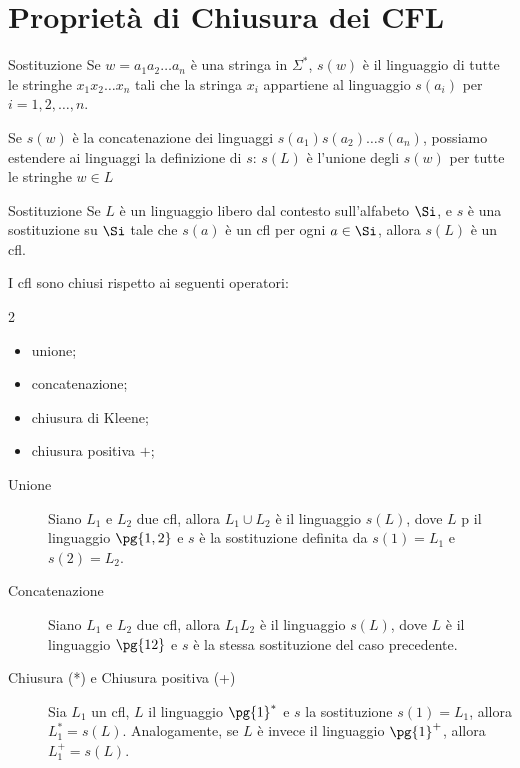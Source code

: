 \section{Proprietà di Chiusura dei CFL}\label{sec:ll_propriet_di_chiusura_dei_cfl} %
\begin{definition}{Sostituzione}{}
    Se $w = a_1a_2\dots a_n$ è una stringa in $\Sigma^*$, $s(w)$ è il linguaggio di tutte le stringhe $x_1x_2\dots x_n$ tali che la stringa $x_i$ appartiene al linguaggio $s(a_i)$ per $i = 1,2,\dots,n$.
    \begin{tip}
        Se $s(w)$ è la concatenazione dei linguaggi $s(a_1)s(a_2)\dots s(a_n)$, possiamo estendere ai linguaggi la definizione di $s$: $s(L)$ è l'unione degli $s(w)$ per tutte le stringhe $w \in L$
    \end{tip}
\end{definition}
\begin{theorem}{Sostituzione}{}
    Se $L$ è un linguaggio libero dal contesto sull'alfabeto $\Si$, e $s$ è una sostituzione su $\Si$ tale che $s(a)$ è un \ac{cfl} per ogni $a \in \Si$, allora $s(L)$ è un \ac{cfl}.
\end{theorem}
\begin{theorem}{}{}
    I \ac{cfl} sono chiusi rispetto ai seguenti operatori:
    \begin{multicols}{2}
        \begin{itemize}
            \item unione;
            \item concatenazione;
            \item chiusura di Kleene;
            \item chiusura positiva $+$;
        \end{itemize}
    \end{multicols}
\end{theorem}
\begin{outerproof}{}{}
    \begin{description}
        \item[Unione] Siano $L_1$ e $L_2$ due \ac{cfl}, allora $L_1\cup L_2$ è il linguaggio $s(L)$, dove $L$ p il linguaggio $\pg{1,2}$ e $s$ è la sostituzione definita da $s(1) = L_1$ e $s(2) = L_2$.
        \item[Concatenazione] Siano $L_1$ e $L_2$ due \ac{cfl}, allora $L_1L_2$ è il linguaggio $s(L)$, dove $L$ è il linguaggio $\pg{12}$ e $s$ è la stessa sostituzione del caso precedente.
        \item[Chiusura (*) e Chiusura positiva (+)] Sia $L_1$ un \ac{cfl}, $L$ il linguaggio $\pg{1}^*$ e $s$ la sostituzione $s(1) = L_1$, allora $L_1^* = s(L)$.
            Analogamente, se $L$ è invece il linguaggio $\pg{1}^+$, allora $L_1^+ = s(L)$.
    \end{description}
\end{outerproof}
